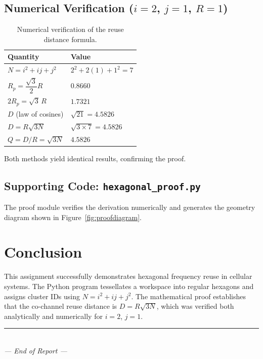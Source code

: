 \documentclass[12pt,a4paper]{report}
\begin{document}
\section{Numerical Verification ($i = 2$, $j = 1$, $R = 1$)}

\begin{table}[H]
    \centering
    \caption{Numerical verification of the reuse distance formula.}
    \label{tab:verification}
    \begin{tabular}{@{}ll@{}}
        \toprule
        \textbf{Quantity} & \textbf{Value} \\
        \midrule
        $N = i^2 + ij + j^2$ & $2^2 + 2(1) + 1^2 = 7$ \\
        $R_p = \dfrac{\sqrt{3}}{2}R$ & $0.8660$ \\
        $2R_p = \sqrt{3}\,R$ & $1.7321$ \\
        $D$ (law of cosines) & $\sqrt{21} = 4.5826$ \\
        $D = R\sqrt{3N}$ & $\sqrt{3 \times 7} = 4.5826$ \\
        $Q = D/R = \sqrt{3N}$ & $4.5826$ \\
        \bottomrule
    \end{tabular}
\end{table}

Both methods yield identical results, confirming the proof.

\section{Supporting Code: \texttt{hexagonal\_proof.py}}

The proof module verifies the derivation numerically and generates the geometry diagram shown in Figure~\ref{fig:proofdiagram}.



\chapter{Conclusion}

This assignment successfully demonstrates hexagonal frequency reuse in cellular systems. The Python program tessellates a workspace into regular hexagons and assigns cluster IDs using $N = i^2 + ij + j^2$. The mathematical proof establishes that the co-channel reuse distance is $D = R\sqrt{3N}$, which was verified both analytically and numerically for $i = 2$, $j = 1$.

\vspace{1cm}
\begin{center}
    \rule{0.4\textwidth}{0.4pt}\\[0.3cm]
    \textit{--- End of Report ---}
\end{center}
\end{document}
